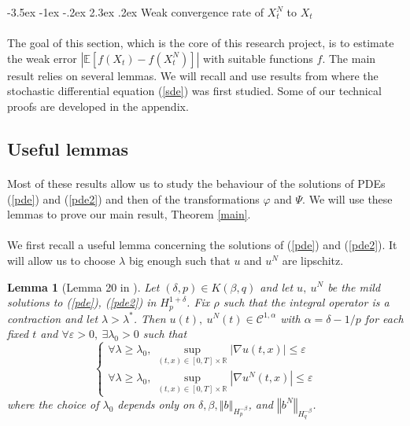 \documentclass[11pt]{enstaPRE}
\makeatletter
\renewcommand\section{\@startsection {section}{1}{\z@}%
    {-3.5ex \@plus -1ex \@minus -.2ex}%
    {2.3ex \@plus.2ex}%
    {\centering\large\scshape\bfseries}}
\newtheorem{lem}[theo]{Lemma}
\newcommand{\norme}[1]{\left\Vert #1\right\Vert}
\newcommand{\R}{\mathbb{R}}
\newcommand{\E}{\mathbb{E}}
\makeatother
\begin{document}
\section{Weak convergence rate of $X^{N}_t$ to $X_t$}
\paragraph{}
The goal of this section, which is the core of this research project, is to estimate the weak error $\left|\E\left[f\left(X_t\right)-f\left(X_t^N\right)\right]\right|$ with suitable functions $f$. The main result relies on several lemmas. We will recall and use results from \cite{Fla-Iss-Rus-2017} where the stochastic differential equation (\ref{sde}) was first studied. Some of our technical proofs are developed in the appendix.

\subsection{Useful lemmas}

\paragraph{}      
Most of these results allow us to study the behaviour of the solutions of PDEs (\ref{pde}) and (\ref{pde2}) and then of the transformations $\varphi$ and $\Psi$. We will use these lemmas to prove our main result, Theorem \ref{main}. 

\paragraph{}
We first recall a useful lemma concerning the solutions of (\ref{pde}) and (\ref{pde2}). It will allow us to choose $\lambda$ big enough such that $u$ and $u^N$ are lipschitz.

\begin{lem}[Lemma 20 in \cite{Fla-Iss-Rus-2017}]\label{lem}
    Let $(\delta,p)\in K(\beta,q)$ and let $u,\ u^N$ be the mild solutions to (\ref{pde}), (\ref{pde2}) in $H_p^{1+\delta}$. Fix $\rho$ such that the integral operator is a contraction and let $\lambda>\lambda^*$. Then $u(t),\ u^N(t)\in\mathcal{C}^{1,\alpha}$ with $\alpha=\delta-1/p$ for each fixed $t$ and $\forall\varepsilon>0,\ \exists\lambda_0>0$ such that
    \begin{equation}
    \begin{cases}\forall\lambda\geq\lambda_0,\
    \underset{(t,x)\in[0,T]\times\R}{\sup} |\nabla u(t,x)| \leq\varepsilon  \\ \forall\lambda\geq\lambda_0,\
    \underset{(t,x)\in[0,T]\times\R}{\sup} |\nabla u^N(t,x)| \leq\varepsilon
    \end{cases}
    \end{equation}
    where the choice of $\lambda_0$ depends only on $\delta,\beta,\norme{b}_{H_p^{-\beta}}$, and $\norme{b^N}_{H_q^{-\beta}}$.
\end{lem}
\end{document}
